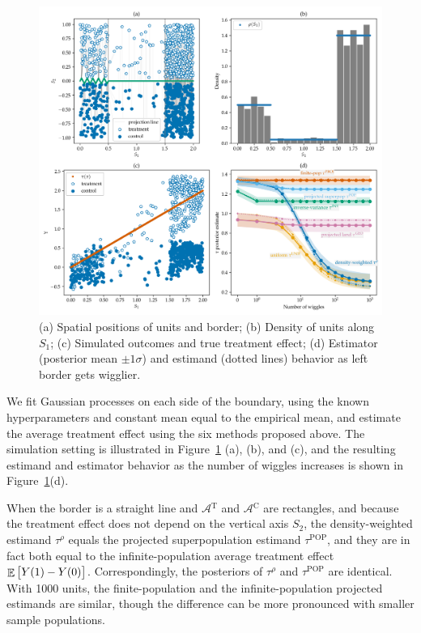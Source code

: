 \documentclass[letter]{article}
\makeatletter
\def\maxwidth{\ifdim\Gin@nat@width>\linewidth\linewidth
\else\Gin@nat@width\fi}
\let\Oldincludegraphics\includegraphics
\renewcommand{\includegraphics}[1]{\Oldincludegraphics[width=.8\maxwidth]{#1}}
\DeclareMathOperator{\E}{\mathbb{E}}
\newcommand{\area}{\mathcal{A}}
\newcommand{\treat}{\mathrm{T}}
\newcommand{\ctrol}{\mathrm{C}}
\newcommand{\treatarea}{\area{}^{\treat}}
\newcommand{\ctrolarea}{\area{}^{\ctrol}}
\newcommand{\taurho}{\tau^{\rho}}
\newcommand{\taupop}{\tau^{\mathrm{POP}}}
\makeatother
\begin{document}
    	\begin{figure}
\centering
\includegraphics{figures/wiggly_boundaries.png}
\caption{\label{fig:wiggly_boundaries} (a) Spatial positions of units and border; (b) Density of units along \(S_1\); (c) Simulated outcomes and true treatment effect; (d) Estimator (posterior mean \(\pm 1 \sigma\)) and estimand (dotted lines) behavior as left border gets wigglier.}
\end{figure}
    


    	We fit Gaussian processes on each side of the boundary,
using the known hyperparameters and constant mean equal to the empirical mean,
and estimate the average treatment effect using the six methods proposed above.
The simulation setting is illustrated in Figure~\ref{fig:wiggly_boundaries} (a), (b), and (c),
and the resulting estimand and estimator behavior as the number of wiggles increases is shown in Figure~\ref{fig:wiggly_boundaries}(d).

When the border is a straight line and \(\treatarea\) and \(\ctrolarea\) are rectangles,
and because the treatment effect does not depend on the vertical axis \(S_2\),
the density-weighted estimand \(\taurho\) equals the projected superpopulation estimand \(\taupop\),
and they are in fact both equal to the infinite-population average treatment effect \(\E\sbr{Y(1)-Y(0)}\).
Correspondingly, the posteriors of \(\taurho\) and \(\taupop\) are identical.
With 1000 units, the finite-population and the infinite-population projected estimands are similar, though the difference can be more pronounced with smaller sample populations.
\end{document}
